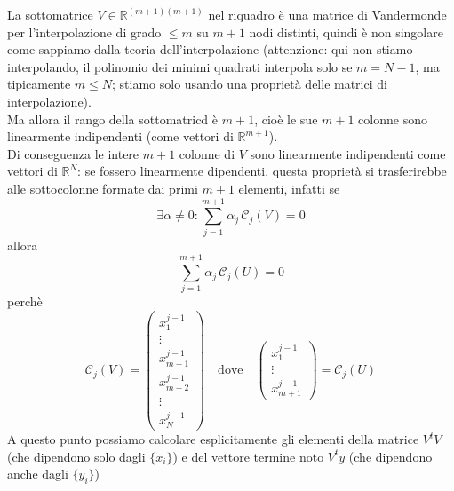 \documentclass[12pt,a4paper]{article}
\begin{document}
La sottomatrice $V\in\mathbb{R}^{(m+1)(m+1)}$ nel riquadro è una matrice di Vandermonde\\
per l'interpolazione di grado $\leq m$ su $m+1$ nodi distinti, quindi è non singolare come sappiamo dalla teoria dell'interpolazione (attenzione: qui non stiamo interpolando, il polinomio dei minimi quadrati interpola solo se $m=N-1$, ma tipicamente $m\leq N$; stiamo solo usando una proprietà delle matrici di interpolazione).\\Ma allora il rango della sottomatricd è $m+1$, cioè le sue $m+1$ colonne sono linearmente indipendenti (come vettori di $\mathbb{R}^{m+1}$).\\
Di conseguenza le intere $m+1$ colonne di $V$ sono linearmente indipendenti come vettori di $\mathbb{R}^N$: se fossero linearmente dipendenti, questa proprietà si trasferirebbe alle sottocolonne formate dai primi $m+1$ elementi, infatti se
\[\exists \alpha \ne 0: \sum_{j=1}^{m+1} \alpha_j \, \mathcal{C}_j(V) = 0\]
allora
\[\sum_{j=1}^{m+1} \alpha_j \, \mathcal{C}_j(U) = 0\]
perchè
\[\mathcal{C}_j(V) = 
\begin{pmatrix}
x_1^{j-1}\\ \vdots \\ x_{m+1}^{j-1} \\ x_{m+2}^{j-1} \\ \vdots \\ x_N^{j-1}
\end{pmatrix}
\quad \text{dove} \quad
\begin{pmatrix}
x_1^{j-1}\\ \vdots \\ x_{m+1}^{j-1}
\end{pmatrix}
= \mathcal{C}_j(U)\]
A questo punto possiamo calcolare esplicitamente gli elementi della matrice $V^t V$ (che dipendono solo dagli $\{x_i\}$) e del vettore termine noto $V^ty$ (che dipendono anche dagli $\{y_i\}$)
\end{document}
